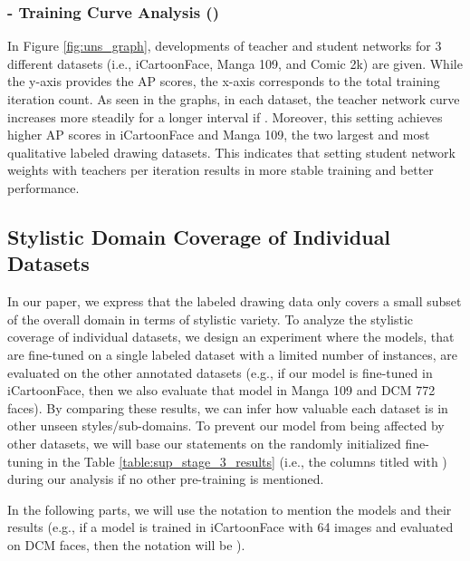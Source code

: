 \documentclass{article}
\begin{document}
\subsubsection{- Training Curve Analysis ()}

In Figure \ref{fig:uns_graph}, developments of teacher and student networks for 3 different datasets (i.e., iCartoonFace, Manga 109, and Comic 2k) are given. While the y-axis provides the AP scores, the x-axis corresponds to the total training iteration count. As seen in the graphs, in each dataset, the teacher network curve increases more steadily for a longer interval if . Moreover, this setting achieves higher AP scores in iCartoonFace and Manga 109, the two largest and most qualitative labeled drawing datasets. This indicates that setting student network weights with teachers per  iteration results in more stable training and better performance.

\subsection{Stylistic Domain Coverage of Individual Datasets}

In our paper, we express that the labeled drawing data only covers a small subset of the overall domain in terms of stylistic variety. To analyze the stylistic coverage of individual datasets, we design an experiment where the models, that are fine-tuned on a single labeled dataset with a limited number of instances, are evaluated on the other annotated datasets (e.g., if our model is fine-tuned in iCartoonFace, then we also evaluate that model in Manga 109 and DCM 772 faces). By comparing these results, we can infer how valuable each dataset is in other unseen styles/sub-domains. To prevent our model from being affected by other datasets, we will base our statements on the randomly initialized fine-tuning in the Table \ref{table:sup_stage_3_results} (i.e., the columns titled with ) during our analysis if no other pre-training is mentioned.

In the following parts, we will use the notation  to mention the models and their results (e.g., if a model is trained in iCartoonFace with 64 images and evaluated on DCM faces, then the notation will be ).
\end{document}
